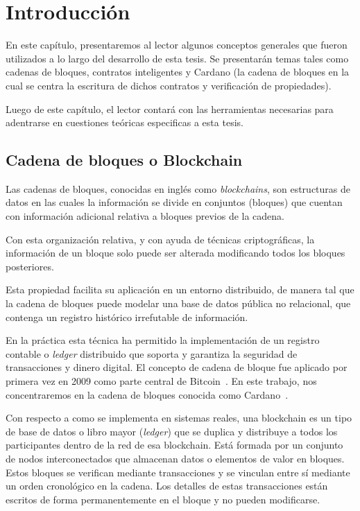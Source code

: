 \documentclass[12pt]{book}
\begin{document}

\chapter{Introducción}

En este capítulo, presentaremos al lector algunos conceptos generales que fueron utilizados a lo largo del desarrollo de esta tesis. Se presentarán temas tales como cadenas de bloques, contratos inteligentes y Cardano (la cadena de bloques en la cual se centra la escritura de dichos contratos y verificación de propiedades).

Luego de este capítulo, el lector contará con las herramientas necesarias para adentrarse en cuestiones teóricas especificas a esta tesis.

\section{Cadena de bloques o Blockchain}
Las cadenas de bloques, conocidas en inglés como \textit{blockchains}, son estructuras de datos en las cuales la información se divide en conjuntos (bloques) que cuentan con información adicional relativa a bloques previos de la cadena.

Con esta organización relativa, y con ayuda de técnicas criptográficas, la información de un bloque solo puede ser alterada modificando todos los bloques posteriores.

Esta propiedad facilita su aplicación en un entorno distribuido, de manera tal que la cadena de bloques puede modelar una base de datos pública no relacional, que contenga un registro histórico irrefutable de información.

En la práctica esta técnica ha permitido la implementación de un registro contable o \textit{ledger} distribuido que soporta y garantiza la seguridad de transacciones y dinero digital.
El concepto de cadena de bloque fue aplicado por primera vez en 2009 como parte central de Bitcoin~\cite{nakamoto2008bitcoin}. En este trabajo, nos concentraremos en la cadena de bloques conocida como Cardano~\cite{cardano_website,cardano_utxo_ledger}.

Con respecto a como se implementa en sistemas reales, una blockchain es un tipo de base de datos o libro mayor (\textit{ledger}) que se duplica y distribuye a todos los participantes dentro de la red de esa blockchain. Está formada por un conjunto de nodos interconectados que almacenan datos o elementos de valor en bloques. Estos bloques se verifican mediante transacciones y se vinculan entre sí mediante un orden cronológico en la cadena. Los detalles de estas transacciones están escritos de forma permanentemente en el bloque y no pueden modificarse.
\end{document}
